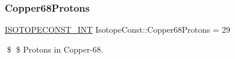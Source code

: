 \subsubsection{\texorpdfstring{Copper68\+Protons}{Copper68Protons}}
{\footnotesize\ttfamily \mbox{\hyperlink{group___isotope_const-_macros_ga5f18360b3e99483a35c32d789e62621c}{I\+S\+O\+T\+O\+P\+E\+C\+O\+N\+S\+T\+\_\+\+I\+NT}} Isotope\+Const\+::\+Copper68\+Protons = 29}

\$ \$ Protons in Copper-\/68. 